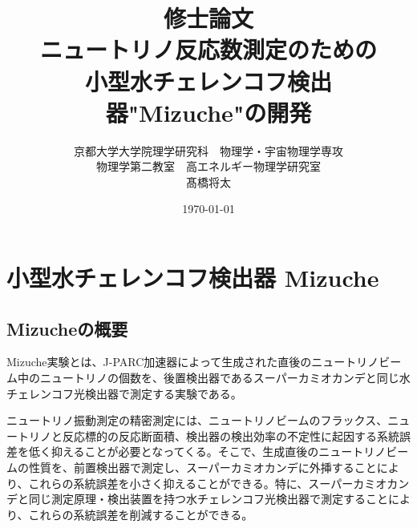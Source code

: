 \documentclass[11pt]{ltjsreport}
\begin{document}
\begin{titlepage}

\title{修士論文\\ニュートリノ反応数測定のための\\小型水チェレンコフ検出器"Mizuche"の開発}
\author{京都大学大学院理学研究科　物理学・宇宙物理学専攻\\
物理学第二教室　高エネルギー物理学研究室\\
髙橋将太
}
\date{\today}


\end{titlepage}

\maketitle

\begin{abstract}
\end{abstract}

\tableofcontents





\chapter{小型水チェレンコフ検出器 Mizuche}

\section{Mizucheの概要}
Mizuche実験とは、J-PARC加速器によって生成された直後のニュートリノビーム中のニュートリノの個数を、後置検出器であるスーパーカミオカンデと同じ水チェレンコフ光検出器で測定する実験である。

ニュートリノ振動測定の精密測定には、ニュートリノビームのフラックス、ニュートリノと反応標的の反応断面積、検出器の検出効率の不定性に起因する系統誤差を低く抑えることが必要となってくる。そこで、生成直後のニュートリノビームの性質を、前置検出器で測定し、スーパーカミオカンデに外挿することにより、これらの系統誤差を小さく抑えることができる。特に、スーパーカミオカンデと同じ測定原理・検出装置を持つ水チェレンコフ光検出器で測定することにより、これらの系統誤差を削減することができる。
\end{document}
